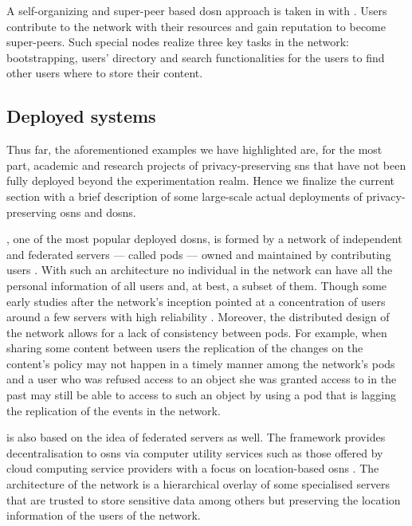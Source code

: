 A self-organizing and super-peer based \ac{dosn} approach is taken in \cite{SharmaD12} 
with \SuperNova. Users contribute to the network with their resources and gain reputation 
to become super-peers. Such special nodes realize three key tasks in the network: 
bootstrapping, users' directory and search functionalities for the users to find 
other users where to store their content.

\subsection{Deployed systems}
    \label{subsection:thesis:deployed-systems}
Thus far, the aforementioned examples we have highlighted are, for the most part, 
academic and research projects of privacy-preserving \acp{sn} that have not been 
fully deployed beyond the experimentation realm. Hence we finalize the current section 
with a brief description of some large-scale actual deployments of privacy-preserving 
\acp{osn} and \acp{dosn}.

\diaspora, one of the most popular deployed \acp{dosn}, is formed by a network of 
independent and federated servers --- called pods --- owned and maintained by contributing 
users \cite{Diaspora}. With such an architecture no individual in the network can have 
all the personal information of all users and, at best, a subset of them. Though 
some early studies after the network's inception pointed at a concentration of users 
around a few servers with high reliability \cite{BielenbergHGSZ12}. Moreover, the 
distributed design of the network allows for a lack of consistency between pods. 
For example, when sharing some content between users the replication of the changes 
on the content's policy may not happen in a timely manner among the network's pods 
and a user who was refused access to an object she was granted access to in the 
past may still be able to access to such an object by using a pod that is lagging the 
replication of the events in the network.

\VisVis is also based on the idea of federated servers as well. The framework provides 
decentralisation to \acp{osn} via computer utility services such as those offered 
by cloud computing service providers with a focus on location-based \acp{osn} \cite{ShakimovLCCLLV11}. 
The architecture of the network is a hierarchical overlay of some specialised servers 
that are trusted to store sensitive data among others but preserving the location 
information of the users of the network.

